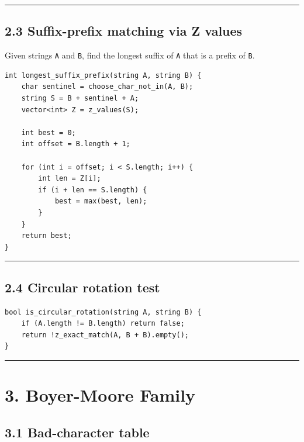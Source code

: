 \documentclass[11pt]{article}
\begin{document}
\begin{center}\rule{0.5\linewidth}{0.5pt}\end{center}

\subsection{2.3 Suffix-prefix matching via Z values}\label{suffix-prefix-matching-via-z-values}

Given strings \texttt{A} and \texttt{B}, find the longest suffix of \texttt{A} that is a prefix of \texttt{B}.

\begin{verbatim}
int longest_suffix_prefix(string A, string B) {
    char sentinel = choose_char_not_in(A, B);
    string S = B + sentinel + A;
    vector<int> Z = z_values(S);

    int best = 0;
    int offset = B.length + 1;

    for (int i = offset; i < S.length; i++) {
        int len = Z[i];
        if (i + len == S.length) {
            best = max(best, len);
        }
    }
    return best;
}
\end{verbatim}

\begin{center}\rule{0.5\linewidth}{0.5pt}\end{center}

\subsection{2.4 Circular rotation test}\label{circular-rotation-test}

\begin{verbatim}
bool is_circular_rotation(string A, string B) {
    if (A.length != B.length) return false;
    return !z_exact_match(A, B + B).empty();
}
\end{verbatim}

\begin{center}\rule{0.5\linewidth}{0.5pt}\end{center}

\section{3. Boyer-Moore Family}\label{boyer-moore-family}

\subsection{3.1 Bad-character table}\label{bad-character-table}
\end{document}
